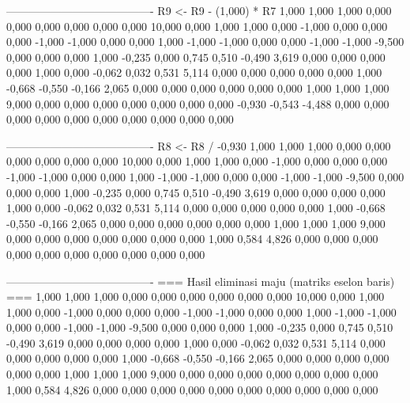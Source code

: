 \documentclass[12pt]{article}
\begin{document}
\begin{enumerate}
\begin{keluaran}
----------------------------------------
R9 <- R9 - (1,000) * R7
1,000   1,000   1,000   0,000   0,000   0,000   0,000   0,000   0,000   10,000
0,000   1,000   1,000   0,000   -1,000  0,000   0,000   0,000   -1,000  -1,000
0,000   0,000   1,000   -1,000  -1,000  0,000   0,000   -1,000  -1,000  -9,500
0,000   0,000   0,000   1,000   -0,235  0,000   0,745   0,510   -0,490  3,619
0,000   0,000   0,000   0,000   1,000   0,000   -0,062  0,032   0,531   5,114
0,000   0,000   0,000   0,000   0,000   1,000   -0,668  -0,550  -0,166  2,065
0,000   0,000   0,000   0,000   0,000   0,000   1,000   1,000   1,000   9,000
0,000   0,000   0,000   0,000   0,000   0,000   0,000   -0,930  -0,543  -4,488
0,000   0,000   0,000   0,000   0,000   0,000   0,000   0,000   0,000   0,000

----------------------------------------
R8 <- R8 / -0,930
1,000   1,000   1,000   0,000   0,000   0,000   0,000   0,000   0,000   10,000
0,000   1,000   1,000   0,000   -1,000  0,000   0,000   0,000   -1,000  -1,000
0,000   0,000   1,000   -1,000  -1,000  0,000   0,000   -1,000  -1,000  -9,500
0,000   0,000   0,000   1,000   -0,235  0,000   0,745   0,510   -0,490  3,619
0,000   0,000   0,000   0,000   1,000   0,000   -0,062  0,032   0,531   5,114
0,000   0,000   0,000   0,000   0,000   1,000   -0,668  -0,550  -0,166  2,065
0,000   0,000   0,000   0,000   0,000   0,000   1,000   1,000   1,000   9,000
0,000   0,000   0,000   0,000   0,000   0,000   0,000   1,000   0,584   4,826
0,000   0,000   0,000   0,000   0,000   0,000   0,000   0,000   0,000   0,000

----------------------------------------
=== Hasil eliminasi maju (matriks eselon baris) ===
1,000   1,000   1,000   0,000   0,000   0,000   0,000   0,000   0,000   10,000
0,000   1,000   1,000   0,000   -1,000  0,000   0,000   0,000   -1,000  -1,000
0,000   0,000   1,000   -1,000  -1,000  0,000   0,000   -1,000  -1,000  -9,500
0,000   0,000   0,000   1,000   -0,235  0,000   0,745   0,510   -0,490  3,619
0,000   0,000   0,000   0,000   1,000   0,000   -0,062  0,032   0,531   5,114
0,000   0,000   0,000   0,000   0,000   1,000   -0,668  -0,550  -0,166  2,065
0,000   0,000   0,000   0,000   0,000   0,000   1,000   1,000   1,000   9,000
0,000   0,000   0,000   0,000   0,000   0,000   0,000   1,000   0,584   4,826
0,000   0,000   0,000   0,000   0,000   0,000   0,000   0,000   0,000   0,000


\end{keluaran}
\end{enumerate}
\end{document}
